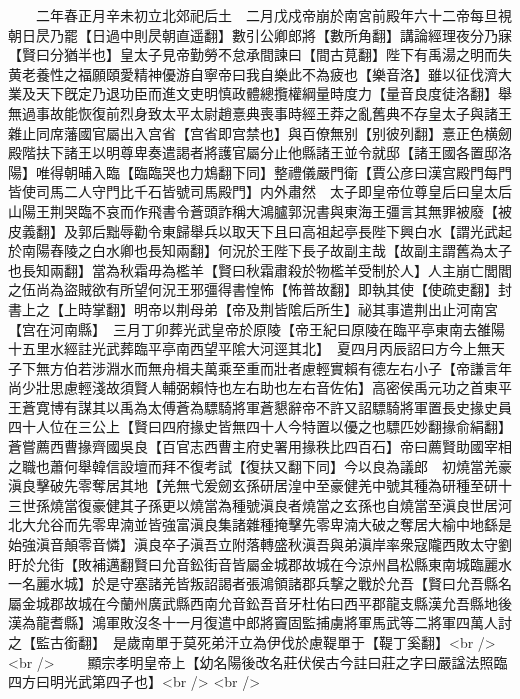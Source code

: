 　　二年春正月辛未初立北郊祀后土　二月戊戍帝崩於南宮前殿年六十二帝每旦視朝日昃乃罷【日過中則昃朝直遥翻】數引公卿郎將【數所角翻】講論經理夜分乃寐【賢曰分猶半也】皇太子見帝勤勞不怠承間諫曰【間古莧翻】陛下有禹湯之明而失黄老養性之福願頤愛精神優游自寧帝曰我自樂此不為疲也【樂音洛】雖以征伐濟大業及天下旣定乃退功臣而進文吏明慎政體總攬權綱量時度力【量音良度徒洛翻】舉無過事故能恢復前烈身致太平太尉趙憙典喪事時經王莽之亂舊典不存皇太子與諸王雜止同席藩國官屬出入宫省【宫省即宫禁也】與百僚無别【别彼列翻】憙正色横劒殿階扶下諸王以明尊卑奏遣謁者將護官屬分止他縣諸王並令就邸【諸王國各置邸洛陽】唯得朝晡入臨【臨臨哭也力鴆翻下同】整禮儀嚴門衛【賈公彦曰漢宫殿門每門皆使司馬二人守門比千石皆號司馬殿門】内外肅然　太子即皇帝位尊皇后曰皇太后　山陽王荆哭臨不哀而作飛書令蒼頭詐稱大鴻臚郭況書與東海王彊言其無罪被廢【被皮義翻】及郭后黜辱勸令東歸舉兵以取天下且曰高祖起亭長陛下興白水【謂光武起於南陽舂陵之白水卿也長知兩翻】何況於王陛下長子故副主哉【故副主謂舊為太子也長知兩翻】當為秋霜毋為檻羊【賢曰秋霜肅殺於物檻羊受制於人】人主崩亡閭閻之伍尚為盜賊欲有所望何況王邪彊得書惶怖【怖普故翻】即執其使【使疏吏翻】封書上之【上時掌翻】明帝以荆母弟【帝及荆皆隂后所生】祕其事遣荆出止河南宮【宫在河南縣】　三月丁卯葬光武皇帝於原陵【帝王紀曰原陵在臨平亭東南去雒陽十五里水經註光武葬臨平亭南西望平隂大河逕其北】　夏四月丙辰詔曰方今上無天子下無方伯若涉淵水而無舟楫夫萬乘至重而壯者慮輕實賴有德左右小子【帝謙言年尚少壯思慮輕淺故須賢人輔弼賴恃也左右助也左右音佐佑】高密侯禹元功之首東平王蒼寛博有謀其以禹為太傅蒼為驃騎將軍蒼懇辭帝不許又詔驃騎將軍置長史掾史員四十人位在三公上【賢曰四府掾史皆無四十人今特置以優之也驃匹妙翻掾俞絹翻】蒼嘗薦西曹掾齊國吳良【百官志西曹主府史署用掾秩比四百石】帝曰薦賢助國宰相之職也蕭何舉韓信設壇而拜不復考試【復扶又翻下同】今以良為議郎　初燒當羌豪滇良擊破先零奪居其地【羌無弋爰劒玄孫研居湟中至豪健羌中號其種為研種至研十三世孫燒當復豪健其子孫更以燒當為種號滇良者燒當之玄孫也自燒當至滇良世居河北大允谷而先零卑湳並皆強富滇良集諸雜種掩擊先零卑湳大破之奪居大榆中地繇是始強滇音顛零音憐】滇良卒子滇吾立附落轉盛秋滇吾與弟滇岸率衆寇隴西敗太守劉盱於允街【敗補邁翻賢曰允音鈆街音皆屬金城郡故城在今涼州昌松縣東南城臨麗水一名麗水城】於是守塞諸羌皆叛詔謁者張鴻領諸郡兵撃之戰於允吾【賢曰允吾縣名屬金城郡故城在今蘭州廣武縣西南允音鈆吾音牙杜佑曰西平郡龍支縣漢允吾縣地後漢為龍耆縣】鴻軍敗沒冬十一月復遣中郎將竇固監捕虜將軍馬武等二將軍四萬人討之【監古銜翻】　是歲南單于莫死弟汗立為伊伐於慮鞮單于【鞮丁奚翻】<br />
<br />
　　顯宗孝明皇帝上【幼名陽後改名莊伏侯古今註曰莊之字曰嚴諡法照臨四方曰明光武第四子也】<br />
<br />
